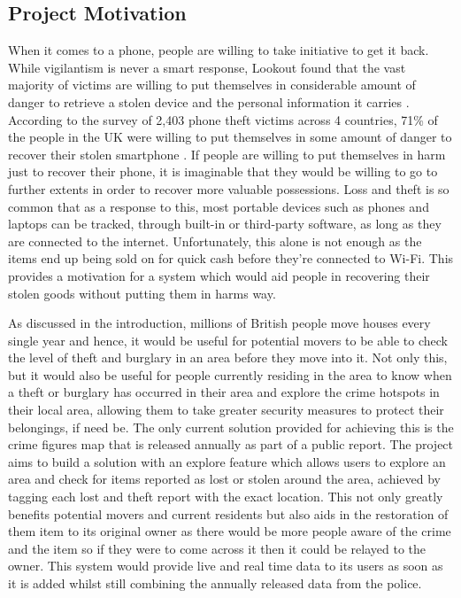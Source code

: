 \subsection{Project Motivation}
When it comes to a phone, people are willing to take initiative to get it back. While vigilantism is never a smart response, Lookout found that the vast majority of victims are willing to put themselves in considerable amount of danger to retrieve a stolen device and the personal information it carries \cite{Lookout:PhoneTheft}. According to the survey of 2,403 phone theft victims across 4 countries, 71\% of the people in the UK were willing to put themselves in some amount of danger to recover their stolen smartphone \cite{Lookout:PhoneTheft}. If people are willing to put themselves in harm just to recover their phone, it is imaginable that they would be willing to go to further extents in order to recover more valuable possessions. Loss and theft is so common that as a response to this, most portable devices such as phones and laptops can be tracked, through built-in or third-party software, as long as they are connected to the internet. Unfortunately, this alone is not enough as the items end up being sold on for quick cash before they’re connected to Wi-Fi. This provides a motivation for a system which would aid people in recovering their stolen goods without putting them in harms way. 

As discussed in the introduction, millions of British people move houses every single year and hence, it would be useful for potential movers to be able to check the level of theft and burglary in an area before they move into it. Not only this, but it would also be useful for people currently residing in the area to know when a theft or burglary has occurred in their area and explore the crime hotspots in their local area, allowing them to take greater security measures to protect their belongings, if need be. The only current solution provided for achieving this is the crime figures map that is released annually as part of a public report. The project aims to build a solution with an explore feature which allows users to explore an area and check for items reported as lost or stolen around the area, achieved by tagging each lost and theft report with the exact location. This not only greatly benefits potential movers and current residents but also aids in the restoration of them item to its original owner as there would be more people aware of the crime and the item so if they were to come across it then it could be relayed to the owner. This system would provide live and real time data to its users as soon as it is added whilst still combining the annually released data from the police.

